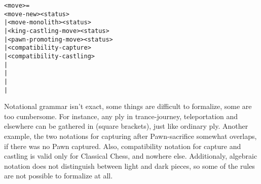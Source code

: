 \begin{alltt}
<move> =
  <move-new><status>
| <move-monolith><status>
| <king-castling-move><status>
| <pawn-promoting-move><status>
| <compatibility-capture>
| <compatibility-castling>
| \alg{#}
| \alg{##}
| \alg{(==)}
| \alg{(===)}
\end{alltt}


Notational grammar isn't exact, some things are difficult to formalize, some are
too cumbersome. For instance, any ply in trance-journey, teleportation and
elsewhere can be gathered in \alg{[ ]} (square brackets), just like ordinary ply.
Another example, the two notations for capturing after Pawn-sacrifice somewhat
overlaps, if there was no Pawn captured. Also, compatibility notation for capture
and castling is valid only for Classical Chess, and nowhere else. Additionaly,
algebraic notation does not distinguish between light and dark pieces, so some
of the rules are not possible to formalize at all.

\clearpage %
